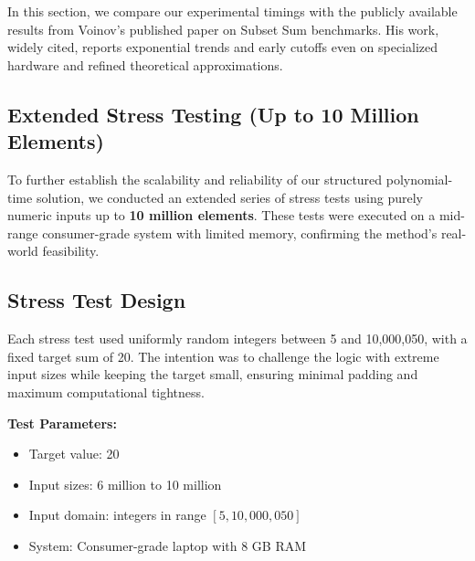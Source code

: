 \documentclass[11pt]{article}
\begin{document}
In this section, we compare our experimental timings with the publicly available results from Voinov’s published paper on Subset Sum benchmarks. His work, widely cited, reports exponential trends and early cutoffs even on specialized hardware and refined theoretical approximations.
\vspace{1em}
\subsection*{Extended Stress Testing (Up to 10 Million Elements)}

To further establish the scalability and reliability of our structured polynomial-time solution, we conducted an extended series of stress tests using purely numeric inputs up to \textbf{10 million elements}. These tests were executed on a mid-range consumer-grade system with limited memory, confirming the method's real-world feasibility.

\subsection*{Stress Test Design}
Each stress test used uniformly random integers between 5 and 10,000,050, with a fixed target sum of 20. The intention was to challenge the logic with extreme input sizes while keeping the target small, ensuring minimal padding and maximum computational tightness.

\vspace{0.5em}
\noindent\textbf{Test Parameters:}
\begin{itemize}
    \item Target value: 20
    \item Input sizes: 6 million to 10 million
    \item Input domain: integers in range $[5, 10{,}000{,}050]$
    \item System: Consumer-grade laptop with 8 GB RAM
\end{itemize}
\end{document}
